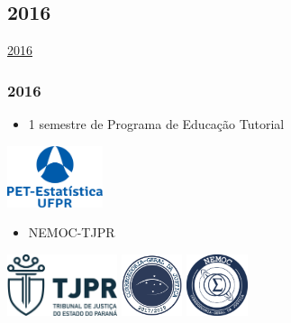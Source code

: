 \documentclass[10pt,
  aspectratio=169,
  serif,
  mathserif,
  professionalfont,
  compress,
  handout,
  ]{beamer}\usepackage[]{graphicx}\usepackage[]{color}
\begin{document}

\subsection{2016}

\begin{frame}[c, allowframebreaks]

\begin{center}

  {\huge \href{https://lineu96.github.io/st/}{2016}}
  
\end{center}

\end{frame}


\begin{frame}

\frametitle{2016}

\begin{itemize}
  \item 1 semestre de Programa de Educação Tutorial
\end{itemize}

\begin{center}
  \includegraphics[height=1.8cm]{img/pet.png}
\end{center}

\begin{itemize}
  \item NEMOC-TJPR
\end{itemize}

\begin{center}
  \includegraphics[height=1.8cm]{img/tjpr.png}\hspace{2em}
  \includegraphics[height=1.8cm]{img/corregedoria.png}\hspace{2em}
  \includegraphics[height=1.8cm]{img/nemoc.png}
\end{center}

\end{frame}
\end{document}
